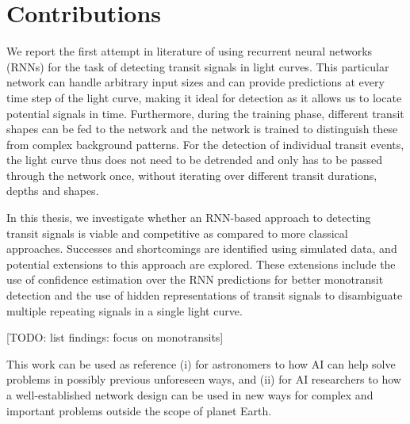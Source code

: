 
\section{Contributions}

We report the first attempt in literature of using recurrent neural networks (RNNs) for the task of detecting transit signals in light curves. This particular network can handle arbitrary input sizes and can provide predictions at every time step of the light curve, making it ideal for detection as it allows us to locate potential signals in time. Furthermore, during the training phase, different transit shapes can be fed to the network and the network is trained to distinguish these from complex background patterns. For the detection of individual transit events, the light curve thus does not need to be detrended and only has to be passed through the network once, without iterating over different transit durations, depths and shapes.

In this thesis, we investigate whether an RNN-based approach to detecting transit signals is viable and competitive as compared to more classical approaches. Successes and shortcomings are identified using simulated data, and potential extensions to this approach are explored. These extensions include the use of confidence estimation over the RNN predictions for better monotransit detection and the use of hidden representations of transit signals to disambiguate multiple repeating signals in a single light curve.

[TODO: list findings: focus on monotransits]

This work can be used as reference (i) for astronomers to how AI can help solve problems in possibly previous unforeseen ways, and (ii) for AI researchers to how a well-established network design can be used in new ways for complex and important problems outside the scope of planet Earth.